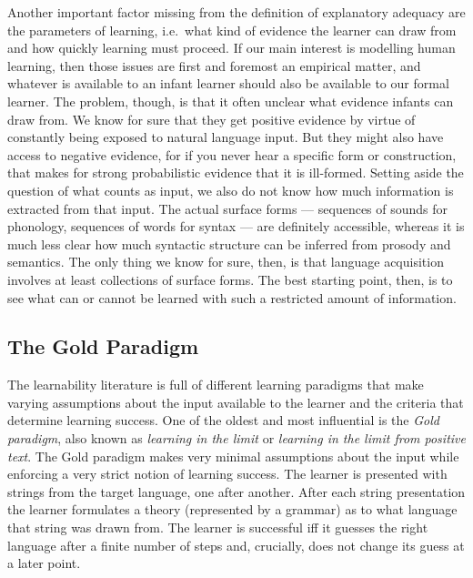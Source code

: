Another important factor missing from the definition of explanatory adequacy are the parameters of learning, i.e.\ what kind of evidence the learner can draw from and how quickly learning must proceed.
If our main interest is modelling human learning, then those issues are first and foremost an empirical matter, and whatever is available to an infant learner should also be available to our formal learner.
The problem, though, is that it often unclear what evidence infants can draw from.
We know for sure that they get positive evidence by virtue of constantly being exposed to natural language input.
But they might also have access to negative evidence, for if you never hear a specific form or construction, that makes for strong probabilistic evidence that it is ill-formed.
Setting aside the question of what counts as input, we also do not know how much information is extracted from that input.
The actual surface forms --- sequences of sounds for phonology, sequences of words for syntax --- are definitely accessible, whereas it is much less clear how much syntactic structure can be inferred from prosody and semantics.
The only thing we know for sure, then, is that language acquisition involves at least collections of surface forms.
The best starting point, then, is to see what can or cannot be learned with such a restricted amount of information.


\subsection{The Gold Paradigm}

The learnability literature is full of different learning paradigms that make varying assumptions about the input available to the learner and the criteria that determine learning success.
One of the oldest and most influential is the \emph{Gold paradigm}, also known as \emph{learning in the limit} or \emph{learning in the limit from positive text}.
The Gold paradigm makes very minimal assumptions about the input while enforcing a very strict notion of learning success.
The learner is presented with strings from the target language, one after another.
After each string presentation the learner formulates a theory (represented by a grammar) as to what language that string was drawn from.
The learner is successful iff it guesses the right language after a finite number of steps and, crucially, does not change its guess at a later point.

